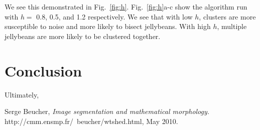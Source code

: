 \documentclass[12pt]{article}
\begin{document}
We see this demonstrated in Fig.~\ref{fig:h}. Fig.~\ref{fig:h}a-c show the algorithm run with $h =$ 0.8, 0.5, and 1.2 respectively. We see that with low $h$, clusters are more susceptible to noise and more likely to bisect jellybeans. With high $h$, multiple jellybeans are more likely to be clustered together.

\section{Conclusion}

Ultimately, 

\begin{thebibliography}{9}

	Serge Beucher,
	\emph{Image segmentation and mathematical morphology.}
	http://cmm.ensmp.fr/~beucher/wtshed.html, May 2010.

\end{thebibliography}
\end{document}
